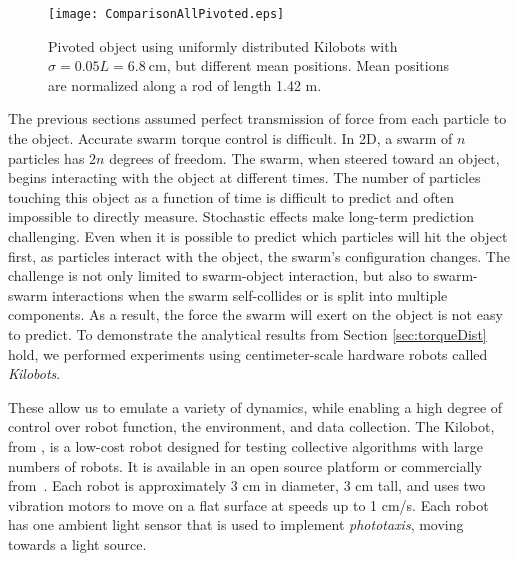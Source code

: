 \begin{figure}
\begin{center}
	\texttt{[image: ComparisonAllPivoted.eps]}
\end{center}
\caption{\label{fig:PivotedKilobot}
Pivoted object using uniformly distributed Kilobots with $\sigma = 0.05 L = \SI{6.8}{\centi \metre}$, but different mean positions. Mean positions are normalized along a rod of length 1.42 m.
}
\end{figure}



The previous sections assumed perfect transmission of force from each particle to the object. 
Accurate swarm torque control is difficult.
In 2D, a swarm of $n$ particles has $2n$ degrees of freedom.  
The swarm, when steered toward an object, begins interacting with the object at different times. 
The number of particles touching this object as a function of time is difficult to predict and often impossible to directly measure.
Stochastic effects make long-term prediction challenging.
Even when it is possible to predict which particles will hit the object first, as particles interact with the object, the swarm's configuration changes.
The challenge is not only limited to swarm-object interaction, but also to swarm-swarm interactions when the swarm self-collides  or is split into multiple components. 
As a result, the force the swarm will exert on the object is not easy to predict. 
To demonstrate the analytical results from Section \ref{sec:torqueDist} hold, we performed experiments using centimeter-scale hardware robots called \emph{Kilobots}.




  These allow us to emulate a variety of dynamics, while enabling a high degree of control over robot function, the environment, and data collection. The Kilobot, from \cite{Rubenstein2012,rubenstein2014programmable}, is a low-cost robot designed for testing collective algorithms with large numbers of robots. It is available in an open source platform or commercially from~\cite{K-Team2015}.  Each robot is approximately 3 cm in diameter, 3 cm tall, and uses two vibration motors to move on a flat surface at speeds up to 1 cm/s.  Each robot has one ambient light sensor that is used to implement \emph{phototaxis},  moving towards a light source. 


